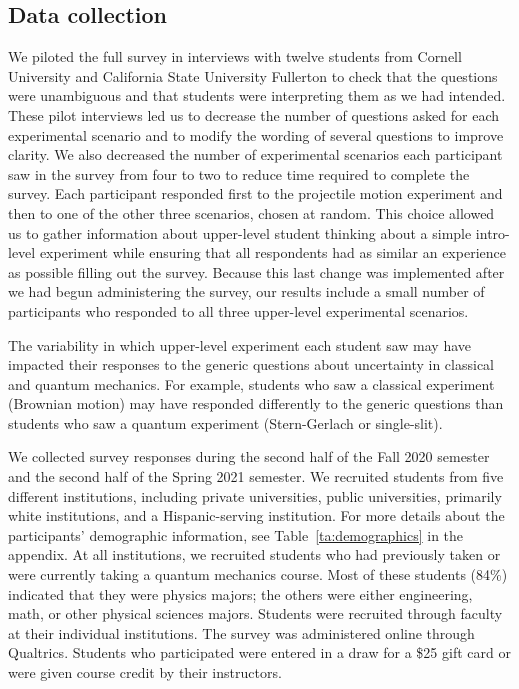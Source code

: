 \documentclass[english,aps,prstper,reprint,showpacs,longbibliography,superscriptaddress,nofootinbib]{revtex4-2}
\begin{document}
\subsection{Data collection}
\label{sec:data_collection}

We piloted the full survey in interviews with twelve students from Cornell University and California State University Fullerton to check that the questions were unambiguous and that students were interpreting them as we had intended. These pilot interviews led us to decrease the number of questions asked for each experimental scenario and to modify the wording of several questions to improve clarity. We also decreased the number of experimental scenarios each participant saw in the survey from four to two to reduce time required to complete the survey. Each participant responded first to the projectile motion experiment and then to one of the other three scenarios, chosen at random. This choice allowed us to gather information about upper-level student thinking about a simple intro-level experiment while ensuring that all respondents had as similar an experience as possible filling out the survey. Because this last change was implemented after we had begun administering the survey, our results include a small number of participants who responded to all three upper-level experimental scenarios.


The variability in which upper-level experiment each student saw may have impacted their responses to the generic questions about uncertainty in classical and quantum mechanics. For example, students who saw a classical experiment (Brownian motion) may have responded differently to the generic questions than students who saw a quantum experiment (Stern-Gerlach or single-slit).

We collected survey responses during the second half of the Fall 2020 semester and the second half of the Spring 2021 semester. We recruited students from five different institutions, including private universities, public universities, primarily white institutions, and a Hispanic-serving institution. For more details about the participants' demographic information, see Table~\ref{ta:demographics} in the appendix. At all institutions, we recruited students who had previously taken or were currently taking a quantum mechanics course. Most of these students (84\%) indicated that they were physics majors; the others were either engineering, math, or other physical sciences majors. Students were recruited through faculty at their individual institutions. The survey was administered online through Qualtrics. Students who participated were entered in a draw for a \$25 gift card or were given course credit by their instructors.
\end{document}
